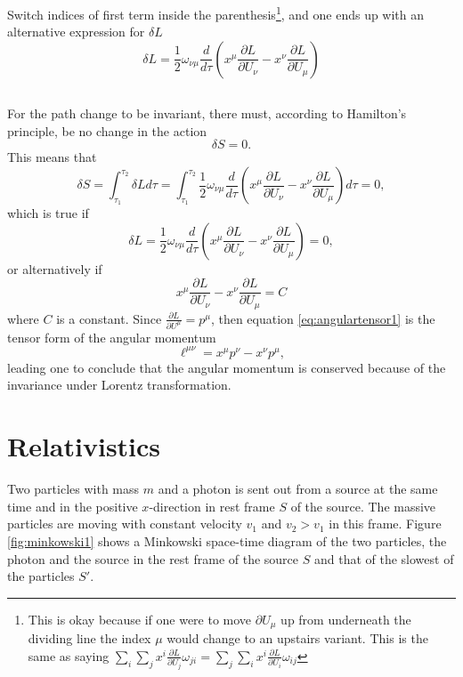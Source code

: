 \documentclass[11pt]{amsart}
\begin{document}
Switch indices of first term inside the parenthesis\footnote{This is okay because if one were to move $\partial U_\mu$ up from underneath the dividing line the index $\mu$ would change to an upstairs variant. This is the same as saying $\sum_i \sum_j x^i\frac{\partial L}{\partial U_j}\omega_{ji} = \sum_j \sum_i x^i\frac{\partial L}{\partial U_i}\omega_{ij}$}, and one ends up with an alternative expression for $\delta L$
\begin{equation}
\delta L = \frac{1}{2}\omega_{\nu\mu} \frac{d}{d\tau}\left(x^\mu\frac{\partial L}{\partial U_\nu} - x^\nu\frac{\partial L}{\partial U_\mu} \right)
\end{equation}

\subsection{}
For the path change to be invariant, there must, according to Hamilton's principle, be no change in the action 
\begin{equation}
\delta S = 0.
\end{equation}
This means that
\begin{equation}
\delta S = \int_{\tau_1}^{\tau_2}\delta L d\tau = \int_{\tau_1}^{\tau_2}\frac{1}{2}\omega_{\nu\mu} \frac{d}{d\tau}\left(x^\mu\frac{\partial L}{\partial U_\nu} - x^\nu\frac{\partial L}{\partial U_\mu} \right) d\tau = 0,
\end{equation}
which is true if
\begin{equation}
\delta L = \frac{1}{2}\omega_{\nu\mu} \frac{d}{d\tau}\left(x^\mu\frac{\partial L}{\partial U_\nu} - x^\nu\frac{\partial L}{\partial U_\mu} \right) = 0,
\end{equation}
or alternatively if
\begin{equation}
\label{eq:angulartensor1}
x^\mu\frac{\partial L}{\partial U_\nu} - x^\nu\frac{\partial L}{\partial U_\mu} = C
\end{equation}
where $C$ is a constant. Since $\frac{\partial L}{\partial U^\mu} = p^\mu$, then equation \ref{eq:angulartensor1} is the tensor form of the angular momentum
\begin{equation}
\ell^{\mu\nu} = x^\mu p^\nu - x^\nu p^\mu,
\end{equation}
leading one to conclude that the angular momentum is conserved because of the invariance under Lorentz transformation.


\section{Relativistics}
Two particles with mass $m$ and a photon is sent out from a source at the same time and in the positive $x$-direction in rest frame $S$ of the source. The massive particles are moving with constant velocity $v_1$ and $v_2>v_1$ in this frame. Figure \ref{fig:minkowski1} shows a Minkowski space-time diagram of the two particles, the photon and the source in the rest frame of the source $S$ and that of the slowest of the particles $S'$. 
\end{document}
